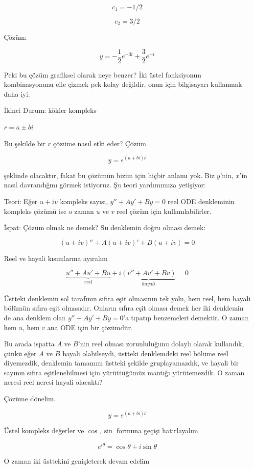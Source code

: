 \documentclass[12pt,fleqn]{article}\usepackage{../../common}
\begin{document}
$$ c_1 = -1/2 $$

$$ c_2 = 3/2 $$

Çözüm: 

$$ y = -\frac{1}{2}e^{-3t} + \frac{3}{2}e^{-t} $$

Peki bu çözüm grafiksel olarak neye benzer? İki üstel fonksiyonun kombinasyonunu
elle çizmek pek kolay değildir, onun için bilgisayarı kullanmak daha iyi.

İkinci Durum: kökler kompleks

$r = a \pm bi$

Bu şekilde bir $r$ çözüme nasıl etki eder? Çözüm

$$ y = e^{(a+bi)t} $$ 

şeklinde olacaktır, fakat bu çözümün bizim için hiçbir anlamı yok. Biz $y$'nin,
$x$'in nasıl davrandığını görmek istiyoruz. Şu teori yardımımıza yetişiyor:

Teori: Eğer $u + iv$ kompleks sayısı, $y'' + Ay' + By = 0$ reel ODE denkleminin
kompleks çözümü ise o zaman $u$ ve $v$ reel çözüm için kullanılabilirler.

İspat: Çözüm olmak ne demek? Su denklemin doğru olması demek: 

$$ (u+iv)'' + A(u+iv)' + B(u+iv) = 0$$

Reel ve hayali kısımlarına ayıralım

$$ 
\underbrace{u'' + Au' + Bu}_{reel} + 
i\underbrace{(v'' + Av' + Bv)}_{hayali} = 0
$$

Üstteki denklemin sol tarafının sıfıra eşit olmasının tek yolu, hem reel, hem
hayali bölümün sıfıra eşit olmasıdır. Onların sıfıra eşit olması demek her iki
denklemin de ana denklem olan $y'' + Ay' + By = 0$'a tıpatıp benzemeleri
demektir. O zaman hem $u$, hem $v$ ana ODE için bir çözümdür.

Bu arada ispatta $A$ ve $B$'nin reel olması zorunluluğunu dolaylı olarak
kullandık, çünkü eğer $A$ ve $B$ hayali olabilseydi, üstteki denklemdeki reel
bölüme reel diyemezdik, denklemin tamamını üstteki şekilde gruplayamazdık, ve
hayali bir sayının sıfıra eşitlenebilmesi için yürüttüğümüz mantığı
yürütemezdik. O zaman neresi reel neresi hayali olacaktı?

Çözüme dönelim. 

$$ y = e^{(a+bi)t} $$ 

Üstel kompleks değerler ve $\cos, \sin$ formuna geçişi hatırlayalım

$$ e^{i\theta} = \cos \theta + i\sin \theta $$

O zaman iki üsttekini genişleterek devam edelim
\end{document}
